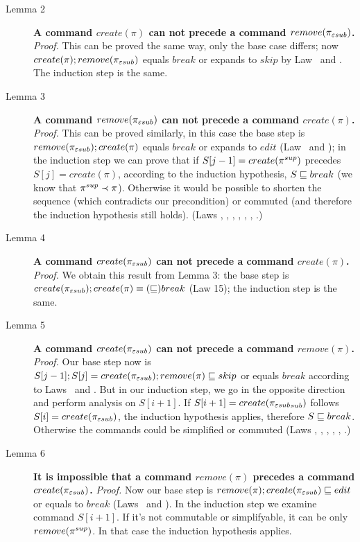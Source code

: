 \begin{description}
\item[Lemma 2]
{\bf A command \(create(\pi)\) can not precede a command  
\(remove(\pi_{\varepsilon sub})\).} 
\emph{Proof.} 
This can be proved the same way, only
the base case differs; now 
\(create(\pi); remove({\pi_{\varepsilon sub}})\) equals \(break\) or expands 
to \(skip\) by Law \lawxvi~and \lawxxvii.
The induction step is the same.

\item[Lemma 3]
{\bf A command \(remove(\pi_{\varepsilon sub})\) can not precede a command
\(create(\pi)\).} 
\emph{Proof.} This can be proved similarly, in this 
case the base step is
\(remove(\pi_{\varepsilon sub}); create({\pi})\) equals \(break\) or
expands to \(edit\) (Law \lawxxi~and \lawxxviii);
in the induction step we can prove that if
\(S[j-1]=create(\pi^{sup})\) precedes \(S[j]=create(\pi)\), according to
the induction hypothesis, \(S\sqsubseteq break\) 
(we know that \(\pi^{sup}\prec\pi\)). Otherwise it would be possible to
shorten the sequence (which contradicts our precondition) or commuted (and therefore the induction hypothesis
still holds). (Laws \lawvii,
\lawviii, \lawxiv, \lawxv, \lawxx, \lawxxi, \lawxxviii.)

\item[Lemma 4]
{\bf A command \(create(\pi_{\varepsilon sub})\) can not precede a command
\(create(\pi)\).} 
\emph{Proof.} 
We obtain this result from Lemma 3: the base step is 
\(create(\pi_{\varepsilon sub}); create({\pi}) \equiv (\sqsubseteq) break\) (Law 15); the
induction step is the same.

\item[Lemma 5]
{\bf A command \(create(\pi_{\varepsilon sub})\) can not precede a command
\(remove(\pi)\).} 
\emph{Proof.} 
Our base step now is 
\(S[j-1];S[j]=create({\pi_{\varepsilon sub}}); remove(\pi)\sqsubseteq skip\) or equals
\(break\) according to Laws \lawxxvii~and \lawxvii.
But in our induction step, we go in the opposite direction and perform
analysis on \(S[i+1]\).
If \(S[i+1]=create({\pi_{\varepsilon sub}}_{sub})\) follows \(S[i]=create(\pi_{\varepsilon sub})\),
the induction hypothesis applies, therefore \(S\sqsubseteq break\). Otherwise
the commands could be simplified or commuted (Laws \lawxviii, \lawxiv,
\lawxv, \lawxvi, \lawxvii, \lawxxvii.)

\item[Lemma 6] 
{\bf It is impossible that a command \(remove(\pi)\)
precedes a command \(create(\pi_{\varepsilon sub})\).} 
\emph{Proof.} 
Now our base step is
\(remove(\pi); create(\pi_{\varepsilon sub})\sqsubseteq edit\) or equals to
\(break\) (Laws \lawxxviii~and \lawxx). In the induction step we
examine command \(S[i+1]\). 
If it's not commutable or simplifyable,
it can be only \(remove(\pi^{sup})\).
In that case the induction hypothesis applies.
\end{description}

